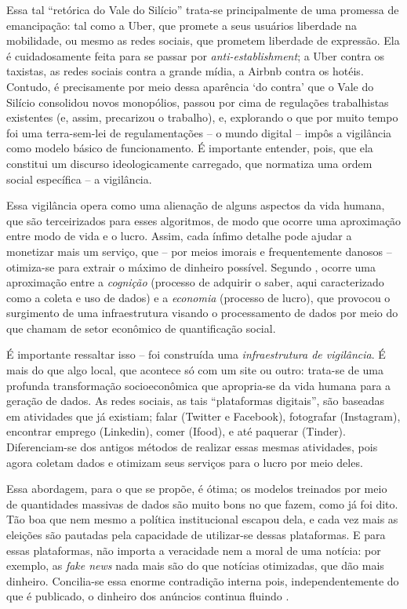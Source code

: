 Essa tal ``retórica do Vale do Silício'' trata-se principalmente de uma promessa de emancipação: tal como a Uber, que promete a seus usuários liberdade na mobilidade, ou mesmo as redes sociais, que prometem liberdade de expressão.
Ela é cuidadosamente feita para se passar por \textit{anti-establishment}; a Uber contra os taxistas, as redes sociais contra a grande mídia, a Airbnb contra os hotéis.
Contudo, é precisamente por meio dessa aparência `do contra' que o Vale do Silício consolidou novos monopólios, passou por cima de regulações trabalhistas existentes (e, assim, precarizou o trabalho), e, explorando o que por muito tempo foi uma terra-sem-lei de regulamentações -- o mundo digital -- impôs a vigilância como modelo básico de funcionamento.
É importante entender, pois, que ela constitui um discurso ideologicamente carregado, que normatiza uma ordem social específica -- a vigilância.

Essa vigilância opera como uma alienação de alguns aspectos da vida humana, que são terceirizados para esses algoritmos, de modo que ocorre uma aproximação entre modo de vida e o lucro.
Assim, cada ínfimo detalhe pode ajudar a monetizar mais um serviço, que -- por meios imorais e frequentemente danosos -- otimiza-se para extrair o máximo de dinheiro possível. Segundo \textcite{mejias_data_2024}, ocorre uma aproximação entre a \textit{cognição} (processo de adquirir o saber, aqui caracterizado como a coleta e uso de dados) e a \textit{economia} (processo de lucro), que provocou o surgimento de uma infraestrutura visando o processamento de dados por meio do que chamam de setor econômico de quantificação social.

É importante ressaltar isso -- foi construída uma \textit{infraestrutura de vigilância}.
É mais do que algo local, que acontece só com um site ou outro: trata-se de uma profunda transformação socioeconômica que apropria-se da vida humana para a geração de dados.
As redes sociais, as tais ``plataformas digitais'', são baseadas em atividades que já existiam; falar (Twitter e Facebook), fotografar (Instagram), encontrar emprego (Linkedin), comer (Ifood), e até paquerar (Tinder).
Diferenciam-se dos antigos métodos de realizar essas mesmas atividades, pois agora coletam dados e otimizam seus serviços para o lucro por meio deles.

Essa abordagem, para o que se propõe, é ótima; os modelos treinados por meio de quantidades massivas de dados são muito bons no que fazem, como já foi dito.
Tão boa que nem mesmo a política institucional escapou dela, e cada vez mais as eleições são pautadas pela capacidade de utilizar-se dessas plataformas.
E para essas plataformas, não importa a veracidade nem a moral de uma notícia: por exemplo, as \textit{fake news} nada mais são do que notícias otimizadas, que dão mais dinheiro.
Concilia-se essa enorme contradição interna pois, independentemente do que é publicado, o dinheiro dos anúncios continua fluindo \cite{morozov_big_2018}.

